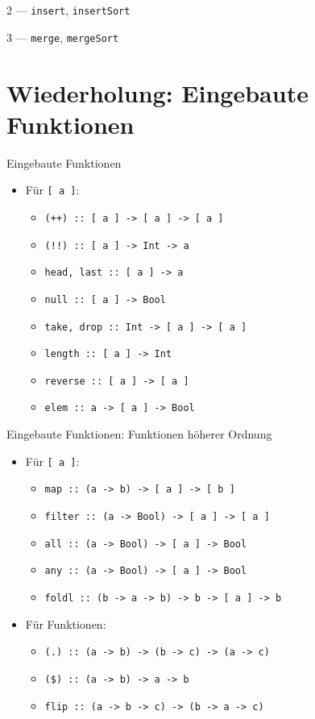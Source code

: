 \documentclass{beamer}
\newcommand{\code}[1]{
	\begin{mdframed}
		
	\end{mdframed}
}
\begin{document}
\begin{frame}{2 --- \texttt{insert}, \texttt{insertSort}}
	\code{demos/Sort1.hs}
\end{frame}

\begin{frame}{3 --- \texttt{merge}, \texttt{mergeSort}}
	\code{demos/Sort2.hs}
\end{frame}

\section{Wiederholung: Eingebaute Funktionen}

\begin{frame}{Eingebaute Funktionen}
	\begin{itemize}
		\item Für \texttt{[ a ]}:
		\begin{itemize}
			\item \texttt{(++) :: [ a ] -> [ a ] -> [ a ]}
			\item \texttt{(!!) :: [ a ] -> Int -> a}
			\item \texttt{head, last :: [ a ] -> a}
			\item \texttt{null :: [ a ] -> Bool}
			\item \texttt{take, drop :: Int -> [ a ] -> [ a ]}
			\item \texttt{length :: [ a ] -> Int}
			\item \texttt{reverse :: [ a ] -> [ a ]}
			\item \texttt{elem :: a -> [ a ] -> Bool}
		\end{itemize}
	\end{itemize}
\end{frame}

\begin{frame}{Eingebaute Funktionen: Funktionen höherer Ordnung}
	\begin{itemize}
		\item Für \texttt{[ a ]}:
		\begin{itemize}
			\item \texttt{map :: (a -> b) -> [ a ] -> [ b ]}
			\item \texttt{filter :: (a -> Bool) -> [ a ] -> [ a ]}
			\item \texttt{all :: (a -> Bool) -> [ a ] -> Bool}
			\item \texttt{any :: (a -> Bool) -> [ a ] -> Bool}
			\item \texttt{foldl :: (b -> a -> b) -> b -> [ a ] -> b}
		\end{itemize}
		\item Für Funktionen:
		\begin{itemize}
			\item \texttt{(.) :: (a -> b) -> (b -> c) -> (a -> c)}
			\item \texttt{(\$) :: (a -> b) -> a -> b}
			\item \texttt{flip :: (a -> b -> c) -> (b -> a -> c)}
		\end{itemize}
	\end{itemize}
\end{frame}
\end{document}
